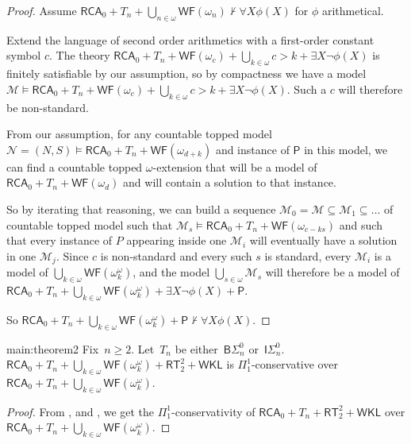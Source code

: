\documentclass{article}
\numberwithin{theorem}{section}
\newcommand{\RCA}{\mathsf{RCA}}
\newcommand{\WKL}{\mathsf{WKL}}
\newcommand{\SEM}{\mathsf{SEM}}
\newcommand{\SADS}{\mathsf{SADS}}
\newcommand{\COH}{\mathsf{COH}}
\newcommand{\BSig}{\mathsf{B}\Sigma^0}
\newcommand{\ISig}{\mathsf{I}\Sigma^0}
\newcommand{\WF}{\mathsf{WF}}
\newcommand{\RT}{\mathsf{RT}}
\newcommand{\M}{\mathcal{M}}
\begin{document}
\begin{proof}
Assume $\RCA_0 + T_n + \bigcup_{n \in \omega} \WF(\omega_n) \not \vdash \forall X \phi(X)$ for $\phi$ arithmetical.  

Extend the language of second order arithmetics with a first-order constant symbol $c$. The theory $\RCA_0 + T_n + \WF(\omega_c) + \bigcup_{k \in \omega} c > k + \exists X \neg \phi(X)$ is finitely satisfiable by our assumption, so by compactness we have a model $\M \models \RCA_0 + T_n + \WF(\omega_c) + \bigcup_{k \in \omega} c > k + \exists X \neg \phi(X)$. Such a $c$ will therefore be non-standard.

From our assumption, for any countable topped model $\mathcal{N} = (N,S) \models \RCA_0 + T_n + \WF(\omega_{d+k})$ and instance of $\mathsf{P}$ in this model, we can find a countable topped $\omega$-extension that will be a model of $\RCA_0 + T_n + \WF(\omega_{d})$ and will contain a solution to that instance.

So by iterating that reasoning, we can build a sequence  $\M_0 = \M \subseteq \M_1 \subseteq \dots$ of countable topped model such that $\M_s \models \RCA_0 + T_n + \WF(\omega_{c - ks})$ and such that every instance of $P$ appearing inside one $\M_i$ will eventually have a solution in one $\M_j$. Since $c$ is non-standard and every such $s$ is standard, every $\M_i$ is a model of $\bigcup_{k \in \omega} \WF(\omega^\omega_k)$, and the model $\bigcup_{s \in \omega} \M_s$ will therefore be a model of $\RCA_0 + T_n + \bigcup_{k \in \omega} \WF(\omega^\omega_k) + \exists X \neg \phi(X) + \mathsf{P}$.

So $\RCA_0 + T_n + \bigcup_{k \in \omega} \WF(\omega^\omega_k)  + \mathsf{P} \not \vdash \forall X \phi(X)$.
\end{proof}

\begin{repmaintheorem}{main:theorem2}
Fix~$n \geq 2$. Let~$T_n$ be either~$\BSig_n$ or~$\ISig_n$.
$\RCA_0 + T_n + \bigcup_{k \in \omega} \WF(\omega^\omega_k) + \RT_2^2 + \WKL$ is $\Pi_1^1$-conservative over $\RCA_0 + T_n + \bigcup_{k \in \omega} \WF(\omega^\omega_k)$.   
\end{repmaintheorem}

\begin{proof}
From ,  and , we get the $\Pi_1^1$-conservativity of $\RCA_0 + T_n + \RT^2_2 + \WKL$ over $\RCA_0 + T_n + \bigcup_{k \in \omega} \WF(\omega^\omega_k)$. %
\end{proof}
\end{document}
